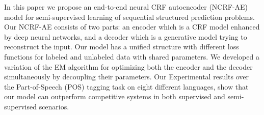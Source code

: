 In this paper we propose an end-to-end neural CRF autoencoder (NCRF-AE) model for semi-supervised learning of sequential structured prediction problems. Our NCRF-AE consists of two parts: an encoder which is a CRF model enhanced by deep neural networks, and a decoder which is a generative model trying to reconstruct the input. Our model has a unified structure with different loss functions for labeled and unlabeled data with shared parameters. We developed a variation of the EM algorithm for optimizing both the encoder and the decoder simultaneously by decoupling their parameters. Our Experimental results over the Part-of-Speech (POS) tagging task on eight different languages, show that our model can outperform competitive systems in both supervised and semi-supervised scenarios.
